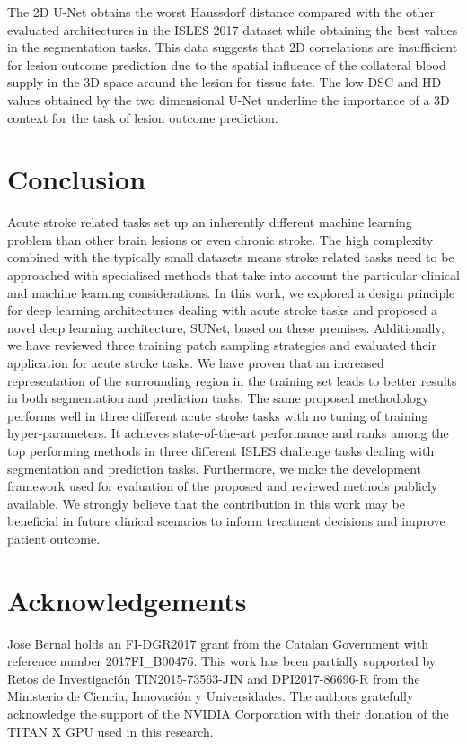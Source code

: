 \documentclass[letterpaper,final,authoryear,3p,times,twocolumn]{elsarticle}
\begin{document}
The 2D U-Net obtains the worst Haussdorf distance compared with the other evaluated architectures in the ISLES 2017 dataset while obtaining the best values in the segmentation tasks. This data suggests that 2D correlations are insufficient for lesion outcome prediction due to the spatial influence of the collateral blood supply in the 3D space around the lesion for tissue fate. The low DSC and HD values obtained by the two dimensional U-Net underline the importance of a 3D context for the task of lesion outcome prediction.

\section{Conclusion}
Acute stroke related tasks set up an inherently different machine learning problem than other brain lesions or even chronic stroke. The high complexity combined with the typically small datasets means stroke related tasks need to be approached with specialised methods that take into account the particular clinical and machine learning considerations. In this work, we explored a design principle for deep learning architectures dealing with acute stroke tasks and proposed a novel deep learning architecture, SUNet, based on these premises. Additionally, we have reviewed three training patch sampling strategies and evaluated their application for acute stroke tasks. We have proven that an increased representation of the surrounding region in the training set leads to better results in both segmentation and prediction tasks. The same proposed methodology performs well in three different acute stroke tasks with no tuning of training hyper-parameters. It achieves state-of-the-art performance and ranks among the top performing methods in three different ISLES challenge tasks dealing with  segmentation and prediction tasks. Furthermore, we make the development framework used for evaluation of the proposed and reviewed methods publicly available. We strongly believe that the contribution in this work may be beneficial in future clinical scenarios to inform treatment decisions and improve patient outcome. 

\section*{Acknowledgements}

Jose Bernal holds an FI-DGR2017 grant from the Catalan Government with reference number 2017FI\_B00476. This work has been partially supported by Retos de Investigaci\'on  TIN2015-73563-JIN and DPI2017-86696-R from the Ministerio de Ciencia, Innovaci\'on y Universidades. The authors gratefully acknowledge the support of the NVIDIA Corporation with their donation of the TITAN X GPU used in this research.
\end{document}
